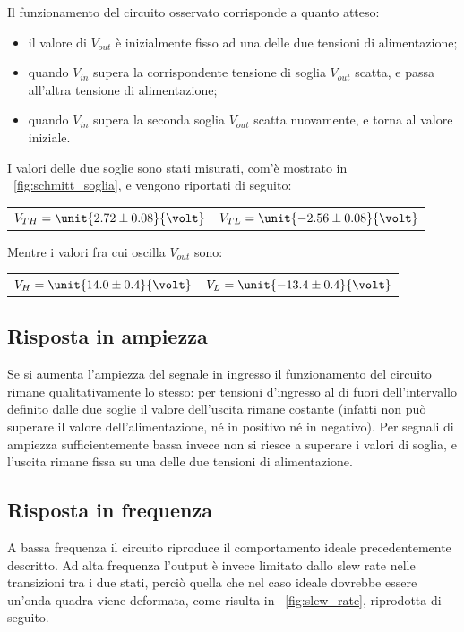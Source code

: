 \documentclass[10pt,a4paper]{article}
\begin{document}
Il funzionamento del circuito osservato corrisponde a quanto atteso:
\begin{itemize}
\item il valore di $V_{out}$ è inizialmente fisso ad una delle due tensioni di alimentazione;
\item quando $V_{in}$ supera la corrispondente tensione di soglia $V_{out}$ scatta, e passa all'altra tensione di alimentazione;
\item quando $V_{in}$ supera la seconda soglia $V_{out}$ scatta nuovamente, e torna al valore iniziale.
\end{itemize}

I valori delle due soglie sono stati misurati, com'è mostrato in \figurename{~\ref{fig:schmitt_soglia}}, e vengono riportati di seguito:

\begin{table}[H]
	\centering
	\begin{tabular}{cc}
        $ V_{TH} = \unit{2.72 \pm 0.08}{\volt}$  & $V_{TL} = \unit{-2.56 \pm 0.08}{\volt}$
	\end{tabular}
\end{table}

Mentre i valori fra cui oscilla $V_{out}$ sono:

\begin{table}[H]
	\centering
	\begin{tabular}{cc}
        $ V_{H} = \unit{14.0 \pm 0.4}{\volt}$  & $V_{L} = \unit{-13.4 \pm 0.4}{\volt}$
	\end{tabular}
\end{table}

\subsection{Risposta in ampiezza} Se si aumenta l'ampiezza del segnale in ingresso il funzionamento del circuito rimane qualitativamente lo stesso: per tensioni d'ingresso al di fuori dell'intervallo definito dalle due soglie il valore dell'uscita rimane costante (infatti non può superare il valore dell'alimentazione, né in positivo né in negativo). Per segnali di ampiezza sufficientemente bassa invece non si riesce a superare i valori di soglia, e l'uscita rimane fissa su una delle due tensioni di alimentazione.

\subsection{Risposta in frequenza} A bassa frequenza il circuito riproduce il comportamento ideale precedentemente descritto. Ad alta frequenza l'output è invece limitato dallo slew rate nelle transizioni tra i due stati, perciò quella che nel caso ideale dovrebbe essere un'onda quadra viene deformata, come risulta in \figurename{~\ref{fig:slew_rate}}, riprodotta di seguito.
\end{document}
